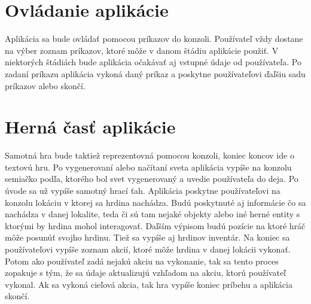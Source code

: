 \section{Ovládanie aplikácie}
Aplikácia sa bude ovládať pomocou príkazov do konzoli. Používateľ vždy dostane na výber zoznam príkazov, ktoré môže v danom štádiu aplikácie použiť. V niektorých štádiách bude aplikácia očakávať aj vstupné údaje od používateľa. Po zadaní príkazu aplikácia vykoná daný príkaz a poskytne používateľovi ďaľšiu sadu príkazov alebo skončí.
\section{Herná časť aplikácie}
Samotná hra bude taktiež reprezentovná pomocou konzoli, koniec koncov ide o textovú hru. Po vygenerovaní alebo načítaní sveta aplikácia vypíše na konzolu semiačko podľa, ktorého bol svet vygenerovaný a uvedie používateľa do deja. Po úvode sa už vypíše samotný hrací ťah. Aplikácia poskytne používateľovi na konzolu lokáciu v ktorej sa hrdina nachádza. Budú poskytnuté aj informácie čo sa nachádza v danej lokalite, teda či sú tam nejaké objekty alebo iné herné entity s ktorými by hrdina mohol interagovať. Daľším výpisom budú pozície na ktoré hráč môže posunúť svojho hrdinu. Tiež sa vypíše aj hrdinov inventár. Na koniec sa používateľovi vypíše zoznam akcií, ktoré môže hrdina v danej lokácii vykonať. Potom ako používateľ zadá nejakú akciu na vykonanie, tak sa tento proces zopakuje s tým, že sa údaje aktualizujú vzhľadom na akciu, ktorú používateľ vykonal. Ak sa vykoná cieľová akcia, tak hra vypíše koniec príbehu a aplikácia skončí.


